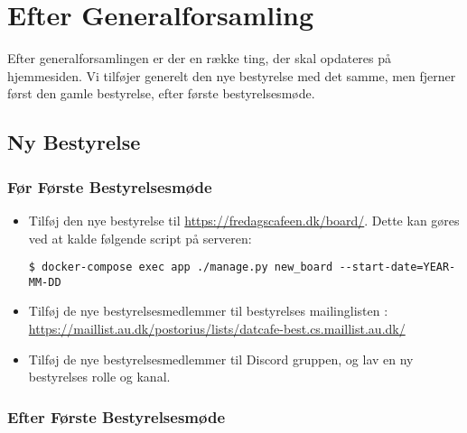 \section{Efter Generalforsamling}
\label{sec:efter-generalforsamling}

Efter generalforsamlingen er der en række ting, der skal opdateres på hjemmesiden.
Vi tilføjer generelt den nye bestyrelse med det samme, men fjerner først den gamle bestyrelse, 
efter første bestyrelsesmøde.

\subsection{Ny Bestyrelse}
\label{sec:ny-bestyrelse}

\subsubsection{Før Første Bestyrelsesmøde}
\label{sec:foer-foerste-bestyrelsesmoede}

\begin{itemize}
    \item Tilføj den nye bestyrelse til \url{https://fredagscafeen.dk/board/}. 
    Dette kan gøres ved at kalde følgende script på serveren:
    {\small\begin{verbatim}
$ docker-compose exec app ./manage.py new_board --start-date=YEAR-MM-DD\end{verbatim}}
    \item Tilføj de nye bestyrelsesmedlemmer til bestyrelses mailinglisten :\\
    {\small\url{https://maillist.au.dk/postorius/lists/datcafe-best.cs.maillist.au.dk/}}
    \item Tilføj de nye bestyrelsesmedlemmer til Discord gruppen, og lav en ny bestyrelses rolle og kanal.
\end{itemize}

\subsubsection{Efter Første Bestyrelsesmøde}
\label{sec:efter-foerste-bestyrelsesmoede}

